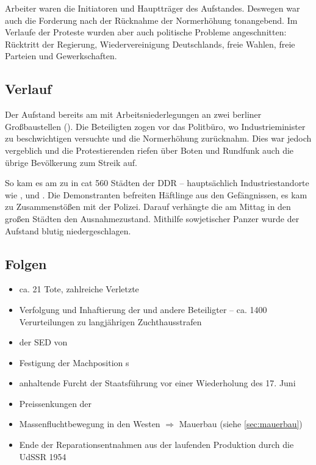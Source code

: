 Arbeiter waren die Initiatoren und Hauptträger des Aufstandes.
Deswegen war auch die Forderung nach der Rücknahme der Normerhöhung
tonangebend. Im Verlaufe der Proteste wurden aber auch politische
Probleme angeschnitten: Rücktritt der Regierung, Wiedervereinigung
Deutschlands, freie Wahlen, freie Parteien und Gewerkschaften.


\subsection*{Verlauf}

Der Aufstand  bereits am  mit
Arbeitsniederlegungen an zwei berliner Großbaustellen
(). Die Beteiligten zogen vor das Politbüro, wo
Industrieminister  zu
beschwichtigen versuchte und die Normerhöhung zurücknahm. Dies war
jedoch vergeblich und die Protestierenden riefen über Boten und
Rundfunk auch die übrige Bevölkerung zum Streik auf.

So kam es am  zu  in
cat 560 Städten der DDR -- hauptsächlich Industriestandorte wie
,  und . Die Demonstranten befreiten
Häftlinge aus den Gefängnissen, es kam zu Zusammenstößen mit der
Polizei. Darauf verhängte die  am Mittag in den großen Städten den
Ausnahmezustand. Mithilfe sowjetischer Panzer wurde der Aufstand
blutig niedergeschlagen.


\subsection*{Folgen}

\begin{itemize}
\item ca. 21 Tote, zahlreiche Verletzte 
\item Verfolgung und Inhaftierung der  und andere
Beteiligter -- ca. 1400 Verurteilungen zu langjährigen
Zuchthausstrafen
\item {} der SED von 
\item Festigung der Machposition s
\item anhaltende Furcht der Staatsführung vor einer Wiederholung des
17. Juni
\item Preissenkungen der 
\item Massenfluchtbewegung in den Westen $\Rightarrow$ Mauerbau (siehe
\ref{sec:mauerbau})
\item Ende der Reparationsentnahmen aus der laufenden Produktion durch
die UdSSR 1954
\end{itemize}

